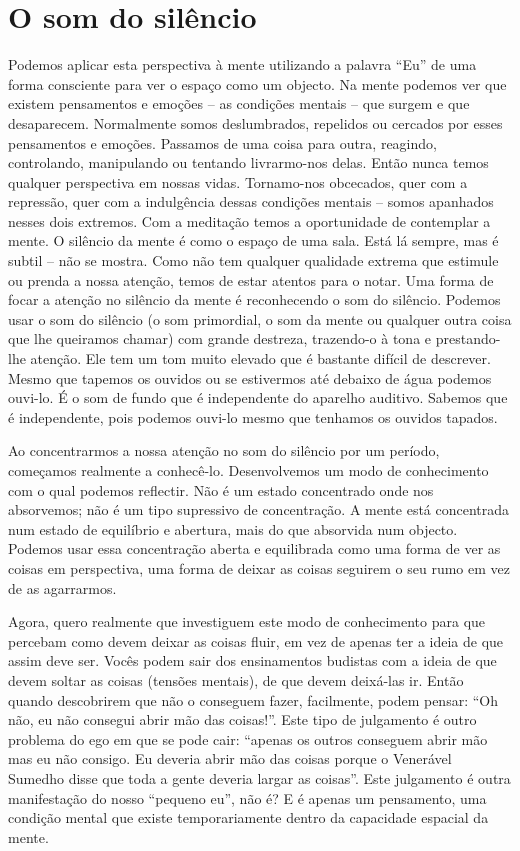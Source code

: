 \section{O som do silêncio}

Podemos aplicar esta perspectiva à mente utilizando a palavra ``Eu'' de
uma forma consciente para ver o espaço como um objecto. Na mente podemos
ver que existem pensamentos e emoções -- as condições mentais -- que
surgem e que desaparecem. Normalmente somos deslumbrados, repelidos ou
cercados por esses pensamentos e emoções. Passamos de uma coisa para
outra, reagindo, controlando, manipulando ou tentando livrarmo-nos
delas. Então nunca temos qualquer perspectiva em nossas vidas.
Tornamo-nos obcecados, quer com a repressão, quer com a indulgência
dessas condições mentais -- somos apanhados nesses dois extremos. Com a
meditação temos a oportunidade de contemplar a mente. O silêncio da
mente é como o espaço de uma sala. Está lá sempre, mas é subtil -- não
se mostra. Como não tem qualquer qualidade extrema que estimule ou
prenda a nossa atenção, temos de estar atentos para o notar. Uma forma
de focar a atenção no silêncio da mente é reconhecendo o som do
silêncio. Podemos usar o som do silêncio (o som primordial, o som da
mente ou qualquer outra coisa que lhe queiramos chamar) com grande
destreza, trazendo-o à tona e prestando-lhe atenção. Ele tem um tom
muito elevado que é bastante difícil de descrever. Mesmo que tapemos os
ouvidos ou se estivermos até debaixo de água podemos ouvi-lo. É o som de
fundo que é independente do aparelho auditivo. Sabemos que é
independente, pois podemos ouvi-lo mesmo que tenhamos os ouvidos
tapados.

Ao concentrarmos a nossa atenção no som do silêncio por um período,
começamos realmente a conhecê-lo. Desenvolvemos um modo de conhecimento
com o qual podemos reflectir. Não é um estado concentrado onde nos
absorvemos; não é um tipo supressivo de concentração. A mente está
concentrada num estado de equilíbrio e abertura, mais do que absorvida
num objecto. Podemos usar essa concentração aberta e equilibrada como
uma forma de ver as coisas em perspectiva, uma forma de deixar as coisas
seguirem o seu rumo em vez de as agarrarmos.

Agora, quero realmente que investiguem este modo de conhecimento para
que percebam como devem deixar as coisas fluir, em vez de apenas ter a
ideia de que assim deve ser. Vocês podem sair dos ensinamentos budistas
com a ideia de que devem soltar as coisas (tensões mentais), de que
devem deixá-las ir. Então quando descobrirem que não o conseguem fazer,
facilmente, podem pensar: ``Oh não, eu não consegui abrir mão das
coisas!''. Este tipo de julgamento é outro problema do ego em que se
pode cair: ``apenas os outros conseguem abrir mão mas eu não consigo. Eu
deveria abrir mão das coisas porque o Venerável Sumedho disse que toda a
gente deveria largar as coisas''. Este julgamento é outra manifestação
do nosso ``pequeno eu'', não é? E é apenas um pensamento, uma condição
mental que existe temporariamente dentro da capacidade espacial da
mente.

